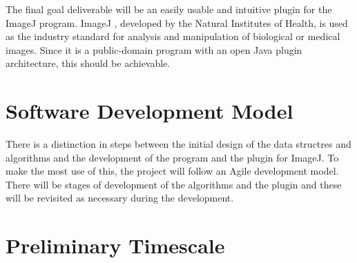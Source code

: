 The final goal deliverable will be an easily usable and intuitive plugin for
the ImageJ program. ImageJ \cite{rasband1997imagej}, developed by the Natural
Institutes of Health, is used as the industry standard for analysis and
manipulation of biological or medical images. Since it is a public-domain
program with an open Java plugin architecture, this should be achievable.

\section{Software Development Model}
\label{sec:software_development_model}

There is a distinction in steps between the initial design of the data
structres and algorithms and the development of the program and the plugin for
ImageJ. To make the most use of this, the project will follow an Agile
development model. There will be stages of development of the algorithms and
the plugin and these will be revisited as necessary during the development.

\section{Preliminary Timescale}
\label{sec:preliminary_timescale}

